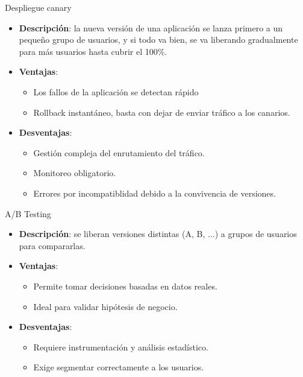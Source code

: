 \documentclass{beamer}
\begin{document}
\begin{frame}{Despliegue canary}
\begin{itemize}
    \item \textbf{Descripción}: la nueva versión de una aplicación se lanza primero a un pequeño grupo de usuarios, y si todo va bien, se va liberando gradualmente para más usuarios hasta cubrir el 100\%.
    \item \textbf{Ventajas}:
    \begin{itemize}
        \item Los fallos de la aplicación se detectan rápido
        \item Rollback instantáneo, basta con dejar de enviar tráfico a los canarios.
    \end{itemize}
    \item \textbf{Desventajas}:
    \begin{itemize}
        \item Gestión compleja del enrutamiento del tráfico.
        \item Monitoreo obligatorio.
        \item Errores por incompatiblidad debido a la convivencia de versiones.

    \end{itemize}
\end{itemize}
\end{frame}

\begin{frame}{A/B Testing}
\begin{itemize}
    \item \textbf{Descripción}: se liberan versiones distintas (A, B, $\dots$) a grupos de usuarios para compararlas.
    \item \textbf{Ventajas}:
    \begin{itemize}
        \item Permite tomar decisiones basadas en datos reales.
        \item Ideal para validar hipótesis de negocio.
    \end{itemize}
    \item \textbf{Desventajas}:
    \begin{itemize}
        \item Requiere instrumentación y análisis estadístico.
        \item Exige segmentar correctamente a los usuarios.
    \end{itemize}
\end{itemize}
\end{frame}
\end{document}
